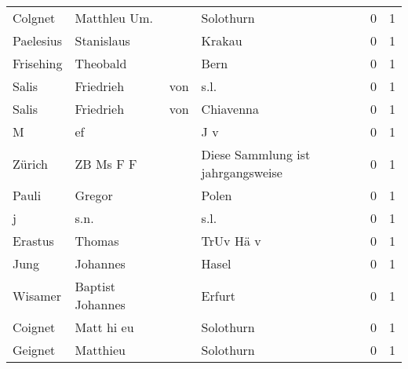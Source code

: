 \documentclass[10pt,a4paper,landscape]{article}
\begin{document}
\begin{longtable}{llllrr}
                  Colgnet &                       Matthleu Um. &             &                                   Solothurn &          0 &         1 \\
                Paelesius &                         Stanislaus &             &                                      Krakau &          0 &         1 \\
                Frisehing &                           Theobald &             &                                        Bern &          0 &         1 \\
                    Salis &                          Friedrieh &         von &                                        s.l. &          0 &         1 \\
                    Salis &                          Friedrieh &         von &                                   Chiavenna &          0 &         1 \\
                        M &                                 ef &             &                                         J v &          0 &         1 \\
                   Zürich &                          ZB Ms F F &             &           Diese Sammlung ist jahrgangsweise &          0 &         1 \\
                    Pauli &                             Gregor &             &                                       Polen &          0 &         1 \\
                        j &                               s.n. &             &                                        s.l. &          0 &         1 \\
                  Erastus &                             Thomas &             &                                   TrUv Hä v &          0 &         1 \\
                     Jung &                           Johannes &             &                                       Hasel &          0 &         1 \\
                  Wisamer &                   Baptist Johannes &             &                                      Erfurt &          0 &         1 \\
                  Coignet &                         Matt hi eu &             &                                   Solothurn &          0 &         1 \\
                  Geignet &                           Matthieu &             &                                   Solothurn &          0 &         1 \\

\end{longtable}
\end{document}
